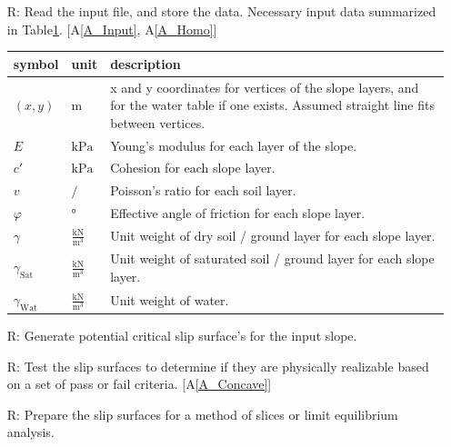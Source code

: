 \documentclass[12pt]{article}
\newcommand{\aref}[1]{A\ref{#1}}
\renewcommand{\arraystretch}{1}
\newcounter{reqnum} %
\newcounter{tablenum} %
\newcommand{\tableref}[1]{Table\ref{#1}}
\begin{document}
\noindent \begin{itemize}

\item[R\refstepcounter{reqnum}\thereqnum \label{R_Inputs}:] Read the
  input file, and store the data. Necessary input data summarized in
  \tableref{Table:Inputs}. [\aref{A_Input}, \aref{A_Homo}]
  
  \renewcommand{\arraystretch}{1.5}
  \noindent \begin{longtable}{l l p{12cm}} \toprule \textbf{symbol} &
    {tablenum}  \label{Table:Inputs}
    \textbf{unit} & \textbf{description}\\ \midrule
    $\left(x,y\right)$ & $\text{m}$ & x and y coordinates for vertices
    of the slope layers, and for the water table if one exists.
    Assumed straight line fits between vertices.\\
    $E$ & $\text{kPa}$ & Young's modulus for each layer of the
    slope.\\
    $c'$ & $\text{kPa}$ & Cohesion for each slope layer. \\
    $v$ & $ / $ & Poisson's ratio for each soil layer. \\
    $\varphi$ & \si{\degree} & Effective angle of friction for each
    slope layer. \\
    $\gamma$ & $\frac{\text{kN}}{\text{m}^3}$ & Unit weight of dry
    soil / ground layer for each slope layer. \\
    $\gamma_{\text{Sat}}$ & $\frac{\text{kN}}{\text{m}^3}$ & Unit
    weight of saturated soil / ground layer for each slope
    layer. \\
    $\gamma_{\text{Wat}}$ & $\frac{\text{kN}}{\text{m}^3}$ & Unit
    weight of water. \\ \bottomrule
\end{longtable}

\item[R\refstepcounter{reqnum}\thereqnum \label{R_InitGen}:] Generate
  potential critical slip surface's for the input slope. 

\item[R\refstepcounter{reqnum}\thereqnum \label{R_KinAdm}:] Test the
  slip surfaces to determine if they are physically realizable based
  on a set of pass or fail criteria. [\aref{A_Concave}]

\item[R\refstepcounter{reqnum}\thereqnum \label{R_Slice}:] Prepare the
  slip surfaces for a method of slices or limit equilibrium analysis.


\end{itemize}
\end{document}

